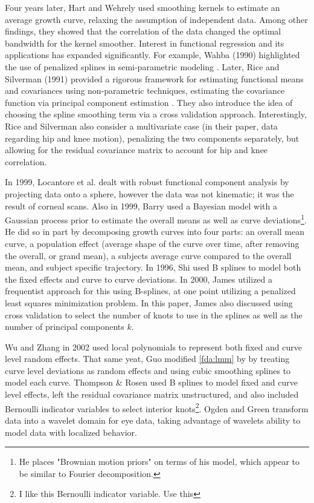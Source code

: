 Four years later, Hart and Wehrely used smoothing kernels to estimate an average growth curve, relaxing the assumption of independent data\cite{hart_kernel_1986}.  
Among other findings, they showed that the correlation of the data changed the optimal bandwidth for the kernel smoother.  
Interest in functional regression and its applications has expanded significantly. 
For example, Wahba (1990) highlighted the use of penalized splines in semi-parametric modeling \cite{wahba_spline_1990}. 
Later, Rice and Silverman (1991) provided a rigorous framework for estimating functional means and covariances using non-parametric techniques, estimating the covariance function via principal component estimation \cite{rice_estimating_1991}.  
They also introduce the idea of choosing the spline smoothing term via a cross validation approach.  
Interestingly, Rice and Silverman also consider a multivariate case (in their paper, data regarding hip and knee motion), penalizing the two components separately, but allowing for the residual covariance matrix to account for hip and knee correlation.

In 1999, Locantore et al. dealt with robust functional component analysis by projecting data onto a sphere, however the data was not kinematic; it was the result of corneal scans\cite{locantore_robust_1999}.  
Also in 1999, Barry used a Bayesian model with a Gaussian process prior to estimate the overall means as well as curve deviations\footnote{He places "Brownian motion priors" on terms of his model, which appear to be similar to Fourier decomposition.}\cite{barry_bayesian_1995}.  
He did so in part by decomposing growth curves into four parts: an overall mean curve, a population effect (average shape of the curve over time, after removing the overall, or grand mean), a subjects average curve compared to the overall mean, and subject specific trajectory.  In 1996, Shi used B splines to model both the fixed effects and curve to curve deviations\cite{shi_analysis_1996}.  
In 2000, James utilized a frequentist approach for this using B-splines, at one point utilizing a penalized least squares minimization problem\cite{james_principal_2000}.  
In this paper, James also discussed using cross validation to select the number of knots to use in the splines as well as the number of principal components \(k\). 

Wu and Zhang in 2002 used local polynomials to represent both fixed and curve level random effects\cite{wu_local_2002}.  
That same yeat, Guo modified \ref{fda:lmm} by by treating curve level deviations as random effects and using cubic smoothing splines to model each curve\cite{guo_functional_2002}.  
Thompson \& Rosen used B splines to model fixed and curve level effects, left the residual covariance matrix unstructured, and also included Bernoulli indicator variables to select interior knots\cite{thompson_bayesian_2008}\footnote{I like this Bernoulli indicator variable.  Use this}.  
Ogden and Green transform data into a wavelet domain for eye data, taking advantage of wavelets ability to model data with localized behavior\cite{ogden_wavelet_2010}. 

